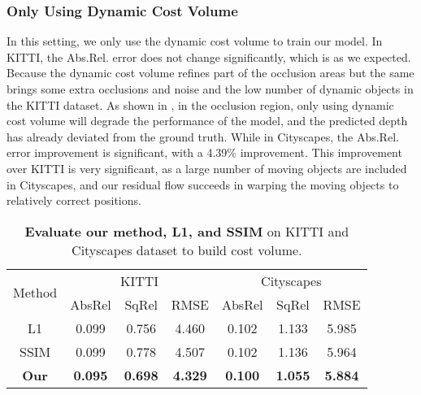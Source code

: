 \documentclass[journal]{IEEEtran}
\begin{document}
\subsubsection{Only Using Dynamic Cost Volume} In this setting, we only use the dynamic cost volume to train our model. In KITTI, the Abs.Rel. error does not change significantly, which is as we expected. Because the dynamic cost volume refines part of the occlusion areas but the same brings some extra occlusions and noise and the low number of dynamic objects in the KITTI dataset. As shown in , in the occlusion region, only using dynamic cost volume will degrade the performance of the model, and the predicted depth has already deviated from the ground truth. While in Cityscapes, the Abs.Rel. error improvement is significant, with a 4.39\% improvement. This improvement over KITTI is very significant, as a large number of moving objects are included in Cityscapes, and our residual flow succeeds in warping the moving objects to relatively correct positions.\\

\begin{table}[!t]
\caption{\textbf{Evaluate our method, L1, and SSIM} on KITTI and Cityscapes dataset to build cost volume.}
\label{tab:3}
\begin{tabular}{cccc|ccc}
\toprule[1pt]
\multirow{2}{*}{Method} & \multicolumn{3}{c|}{KITTI} & \multicolumn{3}{c}{Cityscapes} \\ \cline{2-7} 
                        & AbsRel  & SqRel  & RMSE   & AbsRel    & SqRel    & RMSE    \\ \hline
L1                      & 0.099   & 0.756  & 4.460  & 0.102     & 1.133    & 5.985   \\
SSIM                    & 0.099   & 0.778  & 4.507  & 0.102     & 1.136    & 5.964   \\
\textbf{Our}                     & \textbf{0.095}   & \textbf{0.698}  & \textbf{4.329}  & \textbf{0.100}     & \textbf{1.055}    & \textbf{5.884}   \\ \bottomrule[1pt]
\end{tabular}
\end{table}
\end{document}
